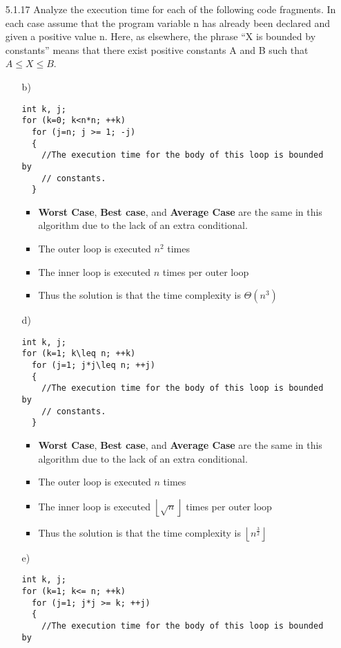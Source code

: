 \begin{enumerate}
\item [5.1.17] Analyze the execution time for each of the following code fragments. In each case assume that the program variable n has already been declared and given a positive value n. Here, as elsewhere, the phrase “X is bounded by constants” means that there exist positive constants A and B such that $A\leq X\leq B$.
  \begin{enumerate}
  \item [] b)
\begin{lstlisting} 
int k, j;
for (k=0; k<n*n; ++k)
  for (j=n; j >= 1; -j)
  {
    //The execution time for the body of this loop is bounded by 
    // constants.
  }
\end{lstlisting}
      \begin{itemize}
      \item \textbf{Worst Case}, \textbf{Best case}, and \textbf{Average Case} are the same in this algorithm due to the lack of an extra conditional.
      \item The outer loop is executed $n^{2}$ times
      \item The inner loop is executed $n$ times per outer loop
      \item Thus the solution is that the time complexity is $\Theta\left(n^{3}\right)$
      \end{itemize}
  \item [] d)
\begin{lstlisting}
int k, j;
for (k=1; k\leq n; ++k)
  for (j=1; j*j\leq n; ++j)
  {
    //The execution time for the body of this loop is bounded by 
    // constants.
  }
\end{lstlisting}
      \begin{itemize}
      \item \textbf{Worst Case}, \textbf{Best case}, and \textbf{Average Case} are the same in this algorithm due to the lack of an extra conditional.
      \item The outer loop is executed $n$ times
      \item The inner loop is executed $\left\lfloor\sqrt{n}\right\rfloor$ times per outer loop
      \item Thus the solution is that the time complexity is $\left\lfloor n^{\frac{3}{2}}\right\rfloor$
      \end{itemize}
  \item [] e)
\begin{lstlisting}
int k, j;
for (k=1; k<= n; ++k)
  for (j=1; j*j >= k; ++j)
  {
    //The execution time for the body of this loop is bounded by

\end{lstlisting}
\end{enumerate}
\end{enumerate}
